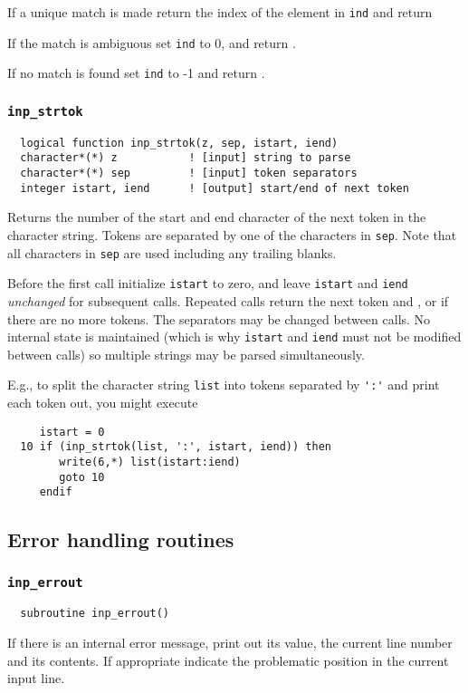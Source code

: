If a unique match is made return the index of the element in
\verb+ind+ and return \TRUE

If the match is ambiguous set \verb+ind+ to 0, and return \FALSE.

If no match is found set \verb+ind+ to -1 and return \FALSE.

\subsubsection{{\tt inp\_strtok}}
\begin{verbatim}
  logical function inp_strtok(z, sep, istart, iend)
  character*(*) z           ! [input] string to parse
  character*(*) sep         ! [input] token separators
  integer istart, iend      ! [output] start/end of next token
\end{verbatim}
Returns the number of the start and end character of the next token in
the character string.  Tokens are separated by one of the characters
in \verb+sep+.  Note that all characters in \verb+sep+ are used including any
trailing blanks.

Before the first call initialize \verb+istart+ to zero, and leave
\verb+istart+ and \verb+iend+ {\em unchanged} for subsequent calls.
Repeated calls return the next token and \TRUE, or \FALSE if there are
no more tokens.  The separators may be changed between calls.  No
internal state is maintained (which is why \verb+istart+ and
\verb+iend+ must not be modified between calls) so multiple strings
may be parsed simultaneously.

E.g., to split the character string \verb+list+ into tokens separated 
by \verb+':'+ and print each token out, you might execute
\begin{verbatim}
     istart = 0
  10 if (inp_strtok(list, ':', istart, iend)) then
        write(6,*) list(istart:iend)
        goto 10
     endif
\end{verbatim}

\subsection{Error handling routines}

\subsubsection{{\tt inp\_errout}}
\begin{verbatim}
  subroutine inp_errout()
\end{verbatim}
If there is an internal error message, print out its value, the
current line number and its contents.  If appropriate indicate the
problematic position in the current input line.

